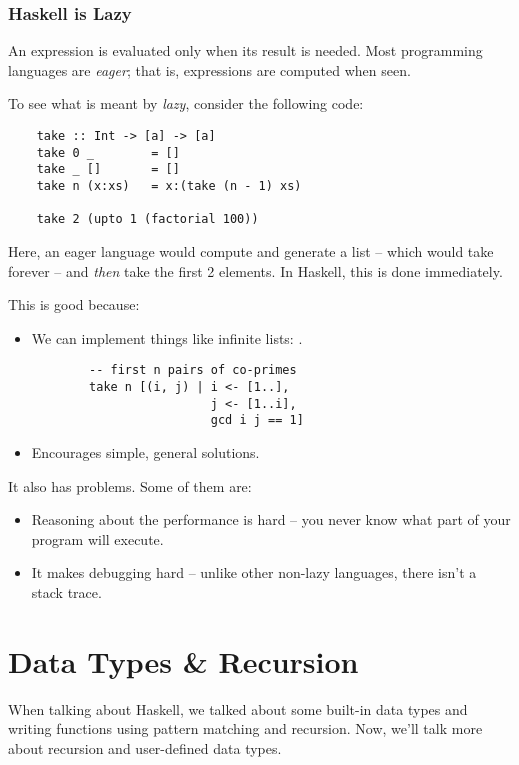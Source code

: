 \documentclass[letterpaper]{article}
\begin{document}
\subsubsection{Haskell is Lazy}
An expression is evaluated only when its result is needed. Most programming languages are \emph{eager}; that is, expressions are computed when seen. 

\bigskip

To see what is meant by \emph{lazy}, consider the following code:
\begin{verbatim}
    take :: Int -> [a] -> [a]
    take 0 _        = []
    take _ []       = []
    take n (x:xs)   = x:(take (n - 1) xs)

    take 2 (upto 1 (factorial 100))
\end{verbatim}
Here, an eager language would compute  and generate a list -- which would take forever -- and \emph{then} take the first 2 elements. In Haskell, this is done immediately.

\bigskip 

This is good because: 
\begin{itemize}
    \item We can implement things like infinite lists: \code{[1..]}. 
    \begin{verbatim}
        -- first n pairs of co-primes 
        take n [(i, j) | i <- [1..],
                         j <- [1..i],
                         gcd i j == 1]\end{verbatim}
        
    \item Encourages simple, general solutions.
\end{itemize}
It also has problems. Some of them are: 
\begin{itemize}
    \item Reasoning about the performance is hard -- you never know what part of your program will execute.
    \item It makes debugging hard -- unlike other non-lazy languages, there isn't a stack trace. 
\end{itemize}




\newpage 
\section{Data Types \& Recursion}
When talking about Haskell, we talked about some built-in data types and writing functions using pattern matching and recursion. Now, we'll talk more about recursion and user-defined data types. 
\end{document}
